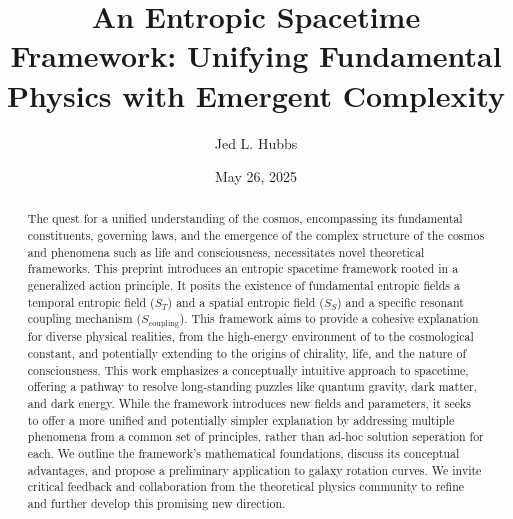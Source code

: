 \documentclass[11pt,a4paper]{article} %
\title{An Entropic Spacetime Framework: Unifying Fundamental Physics with Emergent Complexity}
\author[1]{Jed L. Hubbs}
\affil[1]{Assistant Professor, Boston Children's Hospital/Harvard Medical School}
\affil[1]{300 Longwood Ave. Boston, MA 02115. USA.}
\affil[1]{jed.hubbs@childrens.harvard.edu}
\date{May 26, 2025}
\newcommand{\ST}{S_T}
\newcommand{\SSp}{S_S} %
\newcommand{\Scoupling}{S_{\text{coupling}}}
\newcommand{\QGP}{\text{quark-gluon plasma}} %
\begin{document}
\maketitle

\begin{abstract}
The quest for a unified understanding of the cosmos, encompassing its fundamental constituents, governing laws, and the emergence of the complex structure of the cosmos and phenomena such as life and consciousness, necessitates novel theoretical frameworks. This preprint introduces an entropic spacetime framework rooted in a generalized action principle. It posits the existence of fundamental entropic fields a temporal entropic field ($\ST$) and a spatial entropic field ($\SSp$) and a specific resonant coupling mechanism ($\Scoupling$). This framework aims to provide a cohesive explanation for diverse physical realities, from the high-energy environment of \QGP{} to the cosmological constant, and potentially extending to the origins of chirality, life, and the nature of consciousness. This work emphasizes a conceptually intuitive approach to spacetime, offering a pathway to resolve long-standing puzzles like quantum gravity, dark matter, and dark energy. While the framework introduces new fields and parameters, it seeks to offer a more unified and potentially simpler explanation by addressing multiple phenomena from a common set of principles, rather than ad-hoc solution seperation for each. We outline the framework's mathematical foundations, discuss its conceptual advantages, and propose a preliminary application to galaxy rotation curves. We invite critical feedback and collaboration from the theoretical physics community to refine and further develop this promising new direction.
\end{abstract}

\newpage %
\end{document}
